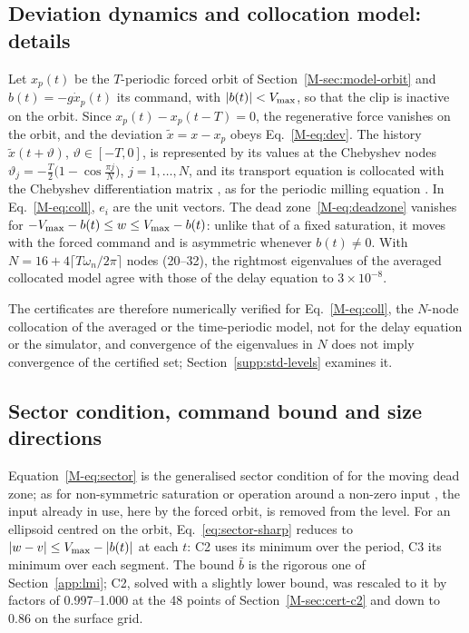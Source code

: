 \subsection{Deviation dynamics and collocation model: details}\label{supp:std-cert-model}

Let $x_p(t)$ be the $T$-periodic forced orbit of Section~\ref{M-sec:model-orbit} and $b(t)=-g\dot x_p(t)$ its command, with $\lvert b(t)\rvert<V_{\max}$, so that the clip is inactive on the orbit. Since $x_p(t)-x_p(t-T)=0$, the regenerative force vanishes on the orbit, and the deviation $\tilde x=x-x_p$ obeys Eq.~\eqref{M-eq:dev}. The history $\tilde x(t+\vartheta)$, $\vartheta\in[-T,0]$, is represented by its values at the Chebyshev nodes $\vartheta_j=-\tfrac T2\big(1-\cos\tfrac{\pi j}{N}\big)$, $j=1,\dots,N$, and its transport equation is collocated with the Chebyshev differentiation matrix \citep{breda2005pseudospectral,breda2015book}, as for the periodic milling equation \citep{butcher2009chebyshev}. In Eq.~\eqref{M-eq:coll}, $e_i$ are the unit vectors. The dead zone~\eqref{M-eq:deadzone} vanishes for $-V_{\max}-b(t)\le w\le V_{\max}-b(t)$: unlike that of a fixed saturation, it moves with the forced command and is asymmetric whenever $b(t)\neq0$. With $N=16+4\lceil T\omega_n/2\pi\rceil$ nodes (20--32), the rightmost eigenvalues of the averaged collocated model agree with those of the delay equation to $3\times10^{-8}$.

The certificates are therefore numerically verified for Eq.~\eqref{M-eq:coll}, the $N$-node collocation of the averaged or the time-periodic model, not for the delay equation or the simulator, and convergence of the eigenvalues in $N$ does not imply convergence of the certified set; Section~\ref{supp:std-levels} examines it.

\subsection{Sector condition, command bound and size directions}\label{supp:std-bound}

Equation~\eqref{M-eq:sector} is the generalised sector condition of \citet{gomesdasilva2005antiwindup} for the moving dead zone; as for non-symmetric saturation or operation around a non-zero input \citep{hu2001book,tarbouriech2011book,hu2002disturbance}, the input already in use, here by the forced orbit, is removed from the level. For an ellipsoid centred on the orbit, Eq.~\eqref{eq:sector-sharp} reduces to $\lvert w-v\rvert\le V_{\max}-\lvert b(t)\rvert$ at each $t$: C2 uses its minimum over the period, C3 its minimum over each segment. The bound $\bar b$ is the rigorous one of Section~\ref{app:lmi}; C2, solved with a slightly lower bound, was rescaled to it by factors of 0.997--1.000 at the 48 points of Section~\ref{M-sec:cert-c2} and down to 0.86 on the surface grid.

